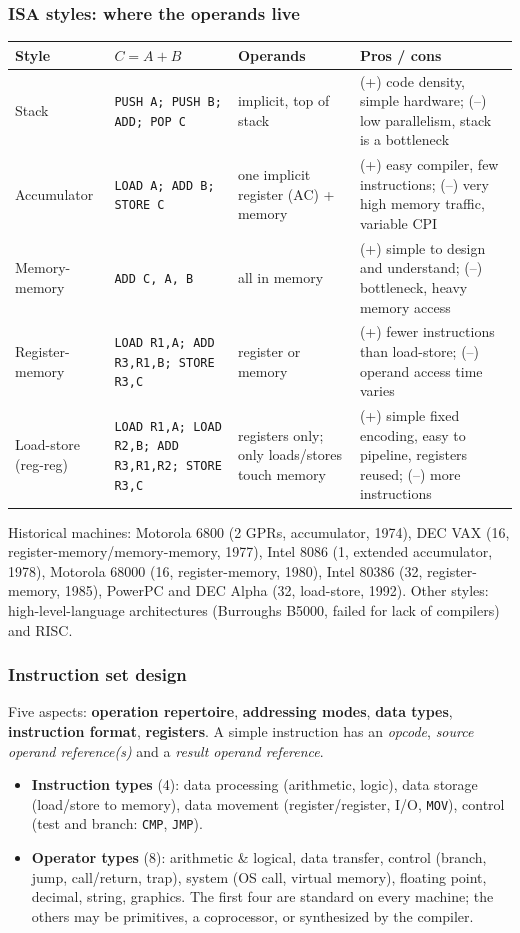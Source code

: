 \subsubsection{ISA styles: where the operands live}
\begin{center}
\small
\begin{tabular}{@{}p{2.4cm}p{3.3cm}p{3.6cm}p{5.1cm}@{}}
\toprule
Style & $C=A+B$ & Operands & Pros / cons \\
\midrule
Stack & \texttt{PUSH A; PUSH B; ADD; POP C} & implicit, top of stack &
(+) code density, simple hardware; (--) low parallelism, stack is a bottleneck \\
Accumulator & \texttt{LOAD A; ADD B; STORE C} & one implicit register (AC) + memory &
(+) easy compiler, few instructions; (--) very high memory traffic, variable CPI \\
Memory-memory & \texttt{ADD C, A, B} & all in memory &
(+) simple to design and understand; (--) bottleneck, heavy memory access \\
Register-memory & \texttt{LOAD R1,A; ADD R3,R1,B; STORE R3,C} & register or memory &
(+) fewer instructions than load-store; (--) operand access time varies \\
Load-store (reg-reg) & \texttt{LOAD R1,A; LOAD R2,B; ADD R3,R1,R2; STORE R3,C} &
registers only; only loads/stores touch memory &
(+) simple fixed encoding, easy to pipeline, registers reused; (--) more
instructions \\
\bottomrule
\end{tabular}
\end{center}
Historical machines: Motorola 6800 (2 GPRs, accumulator, 1974), DEC VAX (16,
register-memory/memory-memory, 1977), Intel 8086 (1, extended accumulator,
1978), Motorola 68000 (16, register-memory, 1980), Intel 80386 (32,
register-memory, 1985), PowerPC and DEC Alpha (32, load-store, 1992). Other
styles: high-level-language architectures (Burroughs B5000, failed for lack of
compilers) and RISC.

\subsubsection{Instruction set design}
Five aspects: \textbf{operation repertoire}, \textbf{addressing modes},
\textbf{data types}, \textbf{instruction format}, \textbf{registers}. A simple
instruction has an \emph{opcode}, \emph{source operand reference(s)} and a
\emph{result operand reference}.
\begin{itemize}[leftmargin=*]
  \item \textbf{Instruction types} (4): data processing (arithmetic, logic),
  data storage (load/store to memory), data movement (register/register, I/O,
  \texttt{MOV}), control (test and branch: \texttt{CMP}, \texttt{JMP}).
  \item \textbf{Operator types} (8): arithmetic \& logical, data transfer,
  control (branch, jump, call/return, trap), system (OS call, virtual memory),
  floating point, decimal, string, graphics. The first four are standard on
  every machine; the others may be primitives, a coprocessor, or synthesized by
  the compiler.
\end{itemize}

